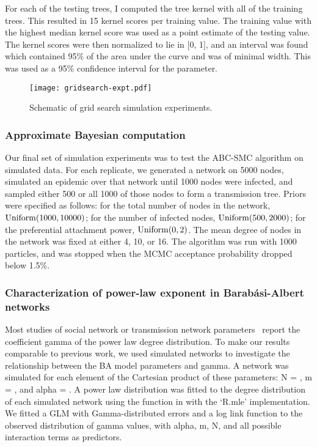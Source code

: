 For each of the testing trees, I computed the tree kernel with all of the
training trees. This resulted in 15 kernel scores per training value. The
training value with the highest median kernel score was used as a point
estimate of the testing value. The kernel scores were then normalized to lie in
[0, 1], and an interval was found which contained 95\% of the area under the
curve and was of minimal width. This was used as a 95\% confidence interval for
the parameter.

\begin{figure}[ht]
  \centering
  \texttt{[image: gridsearch-expt.pdf]}
  \caption{Schematic of grid search simulation experiments.}
  \label{fig:gridsearch}
\end{figure}

\subsubsection{Approximate Bayesian computation}

Our final set of simulation experiments was to test the ABC-SMC algorithm on
simulated data. For each replicate, we generated a network on 5000 nodes,
simulated an epidemic over that network until 1000 nodes were infected, and
sampled either 500 or all 1000 of those nodes to form a transmission tree.
Priors were specified as follows: for the total number of nodes in the network,
$\operatorname{Uniform}(1000, 10000)$; for the number of infected nodes, $\operatorname{Uniform}(500,
2000)$; for the preferential attachment power, $\operatorname{Uniform}(0, 2)$. The mean
degree of nodes in the network was fixed at either 4, 10, or 16. The
algorithm was run with 1000 particles, and was stopped when the \gls{MCMC}
acceptance probability dropped below 1.5\%.

\subsubsection{Characterization of power-law exponent in Barab\'asi-Albert networks}

Most studies of social network or transmission network
parameters~\autocite[e.g.][]{liljeros2001web, jones2003assessment,
schneeberger2004scale, brown2011transmission} report the coefficient
\gls{gamma} of the power law degree distribution. To make our results
comparable to previous work, we used simulated networks to investigate the
relationship between the \gls{BA} model parameters and \gls{gamma}. A network
was simulated for each element of the Cartesian product of these parameters:
\gls{N} = , \gls{m} = , and
\gls{alpha} = . A power law distribution was
fitted to the degree distribution of each simulated network using the
 function in  with the `R.mle'
implementation. We fitted a \gls{GLM} with Gamma-distributed errors and a log
link function to the observed distribution of \gls{gamma} values, with
\gls{alpha}, \gls{m}, \gls{N}, and all possible interaction terms as
predictors.


